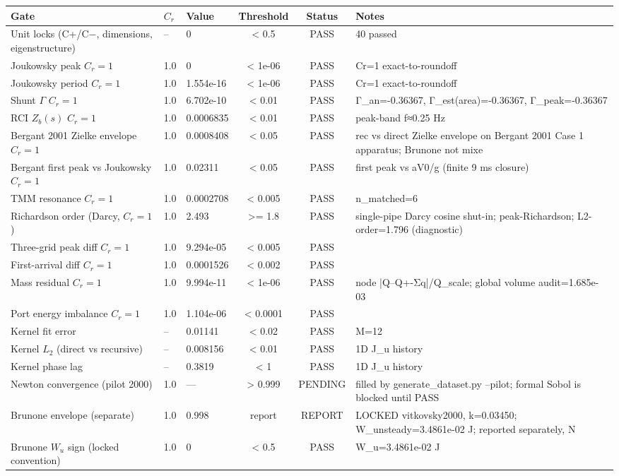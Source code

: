 \begin{tabular}{lllccl}
\hline
Gate & $C_r$ & Value & Threshold & Status & Notes \\
\hline
Unit locks (C+/C−, dimensions, eigenstructure) & -- & 0 & < 0.5 & PASS & 40 passed \\
Joukowsky peak $C_r=1$ & 1.0 & 0 & < 1e-06 & PASS & Cr=1 exact-to-roundoff \\
Joukowsky period $C_r=1$ & 1.0 & 1.554e-16 & < 1e-06 & PASS & Cr=1 exact-to-roundoff \\
Shunt $\Gamma$ $C_r=1$ & 1.0 & 6.702e-10 & < 0.01 & PASS & Γ_an=-0.36367, Γ_est(area)=-0.36367, Γ_peak=-0.36367 \\
RCI $Z_b(s)$ $C_r=1$ & 1.0 & 0.0006835 & < 0.01 & PASS & peak-band f≈0.25 Hz \\
Bergant 2001 Zielke envelope $C_r=1$ & 1.0 & 0.0008408 & < 0.05 & PASS & rec vs direct Zielke envelope on Bergant 2001 Case 1 apparatus; Brunone not mixe \\
Bergant first peak vs Joukowsky $C_r=1$ & 1.0 & 0.02311 & < 0.05 & PASS & first peak vs aV0/g (finite 9 ms closure) \\
TMM resonance $C_r=1$ & 1.0 & 0.0002708 & < 0.005 & PASS & n_matched=6 \\
Richardson order (Darcy, $C_r=1$) & 1.0 & 2.493 & >= 1.8 & PASS & single-pipe Darcy cosine shut-in; peak-Richardson; L2-order=1.796 (diagnostic) \\
Three-grid peak diff $C_r=1$ & 1.0 & 9.294e-05 & < 0.005 & PASS &  \\
First-arrival diff $C_r=1$ & 1.0 & 0.0001526 & < 0.002 & PASS &  \\
Mass residual $C_r=1$ & 1.0 & 9.994e-11 & < 1e-06 & PASS & node |Q--Q+-Σq|/Q_scale; global volume audit=1.685e-03 \\
Port energy imbalance $C_r=1$ & 1.0 & 1.104e-06 & < 0.0001 & PASS &  \\
Kernel fit error & -- & 0.01141 & < 0.02 & PASS & M=12 \\
Kernel $L_2$ (direct vs recursive) & -- & 0.008156 & < 0.01 & PASS & 1D J_u history \\
Kernel phase lag & -- & 0.3819 & < 1 & PASS & 1D J_u history \\
Newton convergence (pilot 2000) & 1.0 & --- & > 0.999 & PENDING & filled by generate_dataset.py --pilot; formal Sobol is blocked until PASS \\
Brunone envelope (separate) & 1.0 & 0.998 & report & REPORT & LOCKED vitkovsky2000, k=0.03450; W_unsteady=3.4861e-02 J; reported separately, N \\
Brunone $W_u$ sign (locked convention) & 1.0 & 0 & < 0.5 & PASS & W_u=3.4861e-02 J \\
\hline
\end{tabular}

